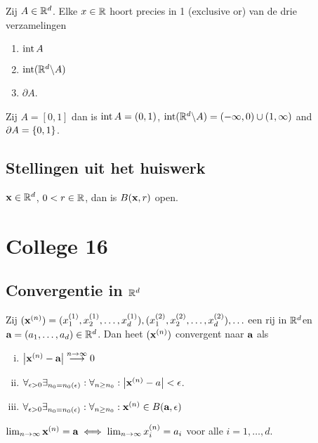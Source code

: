 \documentclass{2wa40summary}
\begin{document}
	\begin{lemma}
		Zij $A\in\mathbb{R}^d$.
		Elke $x \in \mathbb{R}$ hoort precies in 1 (exclusive or) van de drie verzamelingen
		\begin{enumerate}
			\item $\operatorname{\mathop{int}} A$
			\item $\operatorname{\mathop{int}} (\mathbb{R}^d\backslash A)$
			\item $\partial A$.
		\end{enumerate}
	\end{lemma}
	\begin{voorbeeld}
		Zij $A = [0,1]$ dan is $\operatorname{\mathop{int}} A=(0,1)$, $\operatorname{\mathop{int}} (\mathbb{R}^d\backslash A)=(-\infty,0)\cup(1,\infty)$
		and $\partial A = \lbrace0,1\rbrace$.
	\end{voorbeeld}
	
	\subsection{Stellingen uit het huiswerk}
	\begin{theorem}
		${\textbf{x}} \in \mathbb{R}^d$, $0<r\in\mathbb{R}$, dan is $B({\textbf{x}},r)$ open.
	\end{theorem}
	\newpage
	\section{College 16}
	\subsection{Convergentie in $\mathbb{R}^d$}
	\begin{define}
		Zij $({\textbf{x}}^{(n)}) = (x^{(1)}_1,x^{(1)}_2,\ldots,x^{(1)}_d), (x^{(2)}_1,x^{(2)}_2,\ldots,x^{(2)}_d), \ldots$
		een rij in $\mathbb{R}^d$en ${\textbf{a}} =(a_1, \dots ,a_d ) \in \mathbb{R}^d$. Dan heet $({\textbf{x}}^{(n)})$ convergent naar ${\textbf{a}}$ als
		\begin{enumerate}[(i)]
			\item ${\left|{\textbf{x}}^{(n)}-{\textbf{a}}\right|}\stackrel{n\rightarrow \infty}{\longrightarrow} 0$
			\item $\forall _{\epsilon >0} \exists _{n_0=n_0(\epsilon)}: \forall _{n\geq n_0} : \abs{\x\up{n} - a} < \epsilon$.
			\item $\forall _{\epsilon >0} \exists _{n_0=n_0(\epsilon)}: \forall _{n\geq n_0} : \x\up{n} \in B(\a,\epsilon )$
		\end{enumerate}
	\end{define}		
	\begin{theorem}
		$\lim_{n\rightarrow\infty}{\textbf{x}}^{(n)}={\textbf{a}} \iff \lim_{n\to\infty} x^{(n)}_{i} = a_i$ voor alle $i=1,\ldots ,d$.
	\end{theorem}
	
\end{document}
